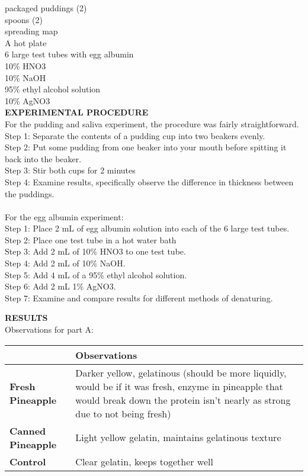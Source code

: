 \documentclass[12pt]{article}
\begin{document}
packaged puddings (2)\\
spoons (2)\\
spreading map\\
A hot plate\\
6 large test tubes with egg albumin\\
10\% HNO3\\
10\% NaOH\\
95\% ethyl alcohol solution\\
10\% AgNO3\\

\textbf{EXPERIMENTAL PROCEDURE}\\
For the pudding and saliva experiment, the procedure was fairly straightforward.\\
Step 1: Separate the contents of a pudding cup into two beakers evenly.\\
Step 2: Put some pudding from one beaker into your mouth before spitting it back into the beaker.\\
Step 3: Stir both cups for 2 minutes\\
Step 4: Examine results, specifically observe the difference in thickness between the puddings.\\
\\
For the egg albumin experiment:\\
Step 1: Place 2 mL of egg albumin solution into each of the 6 large test tubes.\\
Step 2: Place one test tube in a hot water bath\\
Step 3: Add 2 mL of 10\% HNO3 to one test tube.\\
Step 4: Add 2 mL of 10\% NaOH.\\ 
Step 5: Add 4 mL of a 95\% ethyl alcohol solution.\\
Step 6: Add 2 mL 1\% AgNO3.\\ 
Step 7: Examine and compare results for different methods of denaturing.\\

\newpage

\textbf{RESULTS}\\
Observations for part A:\\
\begin{tabularx}{1\textwidth} { 
  | >{\centering\arraybackslash}X 
  | >{\centering\arraybackslash}X | }
 \hline
      & \textbf{Observations} \\
 \hline
    \textbf{Fresh Pineapple} & Darker yellow, gelatinous (should be more liquidly, 
    would be if it was fresh, enzyme in pineapple that would break 
    down the protein isn’t nearly as strong due to not being fresh)  \\
\hline
    \textbf{Canned Pineapple} & Light yellow gelatin, maintains gelatinous texture \\
\hline
    \textbf{Control} & Clear gelatin, keeps together well \\
\hline
\end{tabularx}\\
\end{document}
